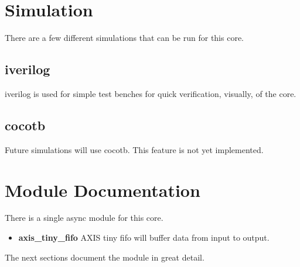 \newpage

\section{Simulation}
\par
There are a few different simulations that can be run for this core.

\subsection{iverilog}
\par
iverilog is used for simple test benches for quick verification, visually, of the core.

\subsection{cocotb}
\par
Future simulations will use cocotb. This feature is not yet implemented.

\newpage

\section{Module Documentation} \label{Module Documentation}

\par
There is a single async module for this core.

\begin{itemize}
\item \textbf{axis\_tiny\_fifo} AXIS tiny fifo will buffer data from input to output.\\
\end{itemize}
The next sections document the module in great detail.

